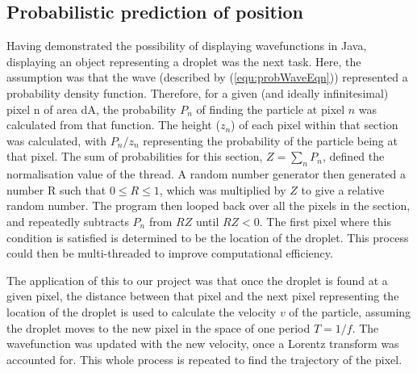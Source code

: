 \subsection{Probabilistic prediction of position}
Having demonstrated the possibility of displaying wavefunctions in Java, displaying an object representing a droplet was the next task. Here, the assumption was that the wave (described by (\ref{equ:probWaveEqn})) represented a probability density function. Therefore, for a given (and ideally infinitesimal) pixel n of area dA, the probability $P_n$ of finding the particle at pixel $n$ was calculated from that function. The height ($z_n$) of each pixel within that section was calculated, with ${P_n}/{z_n}$ representing the probability of the particle being at that pixel. The sum of probabilities for this section, $Z=\sum_n{P_n}$, defined the normalisation value of the thread. A random number generator then generated a number R such that $0\leq R \leq 1$, which was multiplied by $Z$ to give a relative random number. The program then looped back over all the pixels in the section, and repeatedly subtracts $P_n$ from $RZ$ until $RZ<0$. The first pixel where this condition is satisfied is determined to be the location of the droplet. This process could then be multi-threaded to improve computational efficiency.

The application of this to our project was that once the droplet is found at a given pixel, the distance between that pixel and the next pixel representing the location of the droplet is used to calculate the velocity $v$ of the particle, assuming the droplet moves to the new pixel in the space of one period $T=1/f$. The wavefunction was updated with the new velocity, once a Lorentz transform was accounted for. This whole process is repeated to find the trajectory of the pixel.

